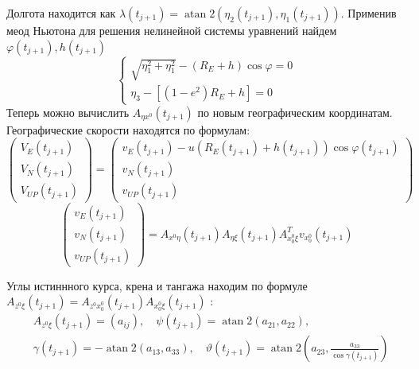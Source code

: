\documentclass[a4paper,14pt]{article}
\theoremstyle{plain} %
\theoremstyle{definition} %
\theoremstyle{remark} %
\begin{document}
{Долгота находится как $\lambda\left(t_{j+1}\right)=\operatorname{atan} 2\left(\eta_{2}\left(t_{j+1}\right), \eta_{1}\left(t_{j+1}\right)\right)$. Применив меод Ньютона для решения нелинейной системы уравнений найдем $\varphi\left(t_{j+1}\right), h\left(t_{j+1}\right)$
$$
    \left\{\begin{array}{l}
        \sqrt{\eta_{1}^{2}+\eta_{1}^{2}}-\left(R_{E}+h\right) \cos \varphi=0 \\
        \eta_{3}-\left[\left(1-e^{2}\right) R_{E}+h\right]=0
    \end{array}\right.
$$
Теперь можно вычислить $A_{\eta x^{0}}\left(t_{j+1}\right)$ по новым географическим координатам. Географические скорости находятся по формулам:
$$
    \left(\begin{array}{c}
            V_{E}\left(t_{j+1}\right) \\
            V_{N}\left(t_{j+1}\right) \\
            V_{U P}\left(t_{j+1}\right)
        \end{array}\right)=\left(\begin{array}{c}
            v_{E}\left(t_{j+1}\right)-u\left(R_{E}\left(t_{j+1}\right)+h\left(t_{j+1}\right)\right) \cos \varphi\left(t_{j+1}\right) \\
            v_{N}\left(t_{j+1}\right)                                                                                                \\
            v_{U P}\left(t_{j+1}\right)
        \end{array}\right)
$$
$$
    \left(\begin{array}{c}
            v_{E}\left(t_{j+1}\right) \\
            v_{N}\left(t_{j+1}\right) \\
            v_{U P}\left(t_{j+1}\right)
        \end{array}\right)=A_{x^{0} \eta}\left(t_{j+1}\right) A_{\eta \xi}\left(t_{j+1}\right) A_{x_{0}^{0} \xi}^{T} v_{x_{0}^{0}}\left(t_{j+1}\right)
$$


Углы истиннного курса, крена и тангажа находим по формуле $A_{z^{0} \xi}\left(t_{j+1}\right)=A_{z^{0} x_{0}^{0}}\left(t_{j+1}\right) A_{x_{0}^{0} \xi}\left(t_{j+1}\right)$ :
$$
    \begin{aligned}
         & A_{z^{0} \xi}\left(t_{j+1}\right)=\left(a_{i j}\right), \quad \psi\left(t_{j+1}\right)=\operatorname{atan} 2\left(a_{21}, a_{22}\right),                                                                   \\
         & \gamma\left(t_{j+1}\right)=-\operatorname{atan} 2\left(a_{13}, a_{33}\right), \quad \vartheta\left(t_{j+1}\right)=\operatorname{atan} 2\left(a_{23}, \frac{a_{33}}{\cos \gamma\left(t_{j+1}\right)}\right)
    \end{aligned}
$$
\newpage
}
\end{document}
